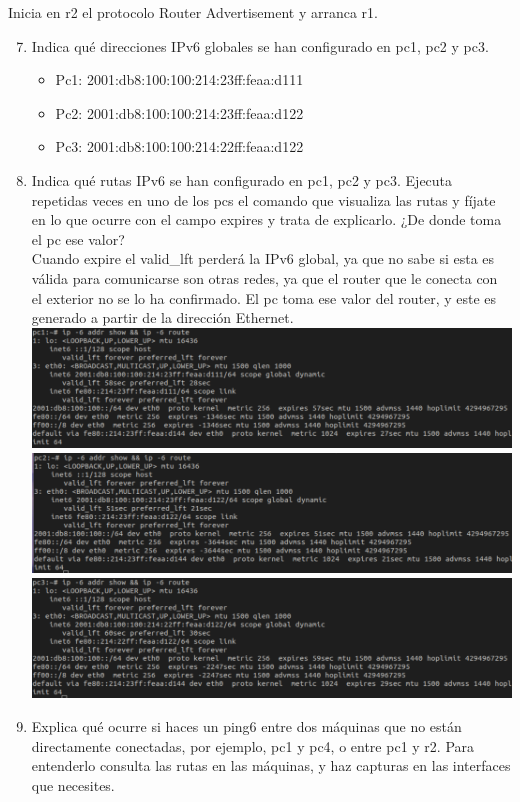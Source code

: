 \documentclass[12pt, a4paper]{report}
\begin{document}
Inicia en r2 el protocolo Router Advertisement y arranca r1.
\begin{enumerate}
	\setcounter{enumi}{6}
	\item Indica qué direcciones IPv6 globales se han configurado en pc1, pc2 y pc3.
	\begin{itemize}
		\item Pc1: 2001:db8:100:100:214:23ff:feaa:d111
		\item Pc2: 2001:db8:100:100:214:23ff:feaa:d122
		\item Pc3: 2001:db8:100:100:214:22ff:feaa:d122
	\end{itemize}
	\item Indica qué rutas IPv6 se han configurado en pc1, pc2 y pc3. Ejecuta repetidas veces en uno
	de los pcs el comando que visualiza las rutas y fíjate en lo que ocurre con el campo expires y
	trata de explicarlo. ¿De donde toma el pc ese valor?\\
	
	Cuando expire el valid\_lft perderá la IPv6 global, ya que no sabe si esta es válida para comunicarse son otras redes, ya que el router que le conecta con el exterior no se lo ha confirmado. El pc toma ese valor del router, y este es generado a partir de la dirección Ethernet.\\
	
	\includegraphics[width=1\textwidth]{ej8_1_1_3}\\
	\includegraphics[width=1\textwidth]{ej8_2_1_3}\\
	\includegraphics[width=1\textwidth]{ej8_3_1_3}
	\item Explica qué ocurre si haces un ping6 entre dos máquinas que no están directamente conectadas,
	por ejemplo, pc1 y pc4, o entre pc1 y r2. Para entenderlo consulta las rutas en las máquinas,
	y haz capturas en las interfaces que necesites.\\
	

\end{enumerate}
\end{document}
